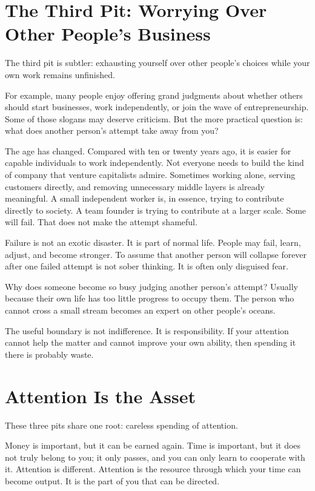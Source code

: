 \section*{The Third Pit: Worrying Over Other People's Business}

The third pit is subtler: exhausting yourself over other people's choices while your own work remains unfinished.

For example, many people enjoy offering grand judgments about whether others should start businesses, work independently, or join the wave of entrepreneurship. Some of those slogans may deserve criticism. But the more practical question is: what does another person's attempt take away from you?

The age has changed. Compared with ten or twenty years ago, it is easier for capable individuals to work independently. Not everyone needs to build the kind of company that venture capitalists admire. Sometimes working alone, serving customers directly, and removing unnecessary middle layers is already meaningful. A small independent worker is, in essence, trying to contribute directly to society. A team founder is trying to contribute at a larger scale. Some will fail. That does not make the attempt shameful.

Failure is not an exotic disaster. It is part of normal life. People may fail, learn, adjust, and become stronger. To assume that another person will collapse forever after one failed attempt is not sober thinking. It is often only disguised fear.

Why does someone become so busy judging another person's attempt? Usually because their own life has too little progress to occupy them. The person who cannot cross a small stream becomes an expert on other people's oceans.

The useful boundary is not indifference. It is responsibility. If your attention cannot help the matter and cannot improve your own ability, then spending it there is probably waste.

\section*{Attention Is the Asset}

These three pits share one root: careless spending of attention.

Money is important, but it can be earned again. Time is important, but it does not truly belong to you; it only passes, and you can only learn to cooperate with it. Attention is different. Attention is the resource through which your time can become output. It is the part of you that can be directed.

